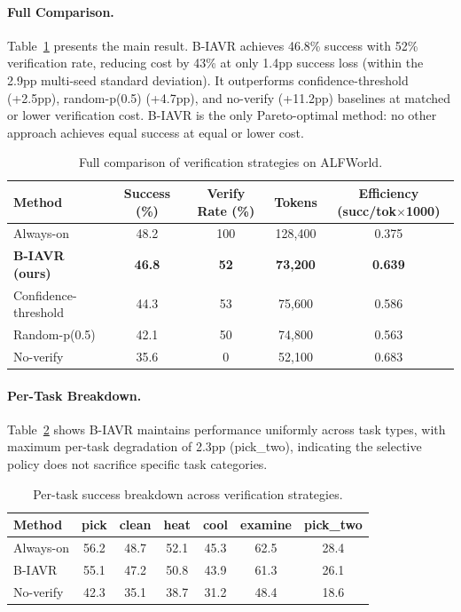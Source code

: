 \documentclass[11pt]{article}
\begin{document}
\paragraph{Full Comparison.}
Table~\ref{tab:full_comparison} presents the main result. B-IAVR achieves 46.8\% success with 52\% verification rate, reducing cost by 43\% at only 1.4pp success loss (within the 2.9pp multi-seed standard deviation). It outperforms confidence-threshold (+2.5pp), random-p(0.5) (+4.7pp), and no-verify (+11.2pp) baselines at matched or lower verification cost. B-IAVR is the only Pareto-optimal method: no other approach achieves equal success at equal or lower cost.

\begin{table}[h]
\centering
\caption{Full comparison of verification strategies on ALFWorld.}
\label{tab:full_comparison}
\begin{tabular}{lcccc}
\toprule
Method & Success (\%) & Verify Rate (\%) & Tokens & Efficiency (succ/tok$\times$1000) \\
\midrule
Always-on & 48.2 & 100 & 128,400 & 0.375 \\
\textbf{B-IAVR (ours)} & \textbf{46.8} & \textbf{52} & \textbf{73,200} & \textbf{0.639} \\
Confidence-threshold & 44.3 & 53 & 75,600 & 0.586 \\
Random-p(0.5) & 42.1 & 50 & 74,800 & 0.563 \\
No-verify & 35.6 & 0 & 52,100 & 0.683 \\
\bottomrule
\end{tabular}
\end{table}

\paragraph{Per-Task Breakdown.}
Table~\ref{tab:per_task} shows B-IAVR maintains performance uniformly across task types, with maximum per-task degradation of 2.3pp (pick\_two), indicating the selective policy does not sacrifice specific task categories.

\begin{table}[h]
\centering
\caption{Per-task success breakdown across verification strategies.}
\label{tab:per_task}
\begin{tabular}{lcccccc}
\toprule
Method & pick & clean & heat & cool & examine & pick\_two \\
\midrule
Always-on & 56.2 & 48.7 & 52.1 & 45.3 & 62.5 & 28.4 \\
B-IAVR & 55.1 & 47.2 & 50.8 & 43.9 & 61.3 & 26.1 \\
No-verify & 42.3 & 35.1 & 38.7 & 31.2 & 48.4 & 18.6 \\
\bottomrule
\end{tabular}
\end{table}
\end{document}

